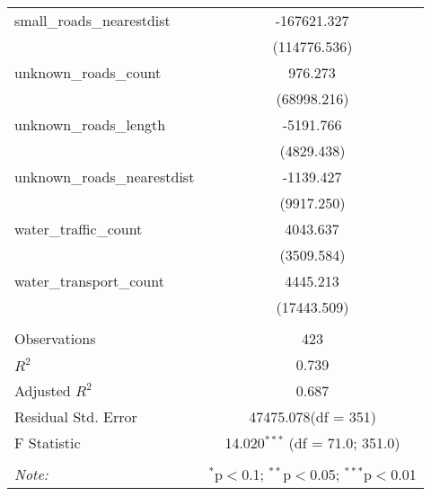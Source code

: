 \begin{table}[!htbp]
\begin{tabular}{@{\extracolsep{5pt}}lc}
 small_roads_nearestdist & -167621.327$^{}$ \\
  & (114776.536) \\
 unknown_roads_count & 976.273$^{}$ \\
  & (68998.216) \\
 unknown_roads_length & -5191.766$^{}$ \\
  & (4829.438) \\
 unknown_roads_nearestdist & -1139.427$^{}$ \\
  & (9917.250) \\
 water_traffic_count & 4043.637$^{}$ \\
  & (3509.584) \\
 water_transport_count & 4445.213$^{}$ \\
  & (17443.509) \\
\hline \\[-1.8ex]
 Observations & 423 \\
 $R^2$ & 0.739 \\
 Adjusted $R^2$ & 0.687 \\
 Residual Std. Error & 47475.078(df = 351)  \\
 F Statistic & 14.020$^{***}$ (df = 71.0; 351.0) \\
\hline
\hline \\[-1.8ex]
\textit{Note:} & \multicolumn{1}{r}{$^{*}$p$<$0.1; $^{**}$p$<$0.05; $^{***}$p$<$0.01} \\
\end{tabular}
\end{table}